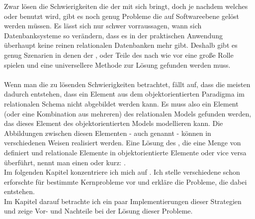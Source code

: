 Zwar lösen \OODBMSs die Schwierigkeiten die der \IM mit sich bringt, doch je nachdem welches \ORDBMS oder \RDBMS benutzt wird, gibt es noch genug Probleme die auf Softwareebene gelöst werden müssen. Es lässt sich nur schwer vorraussagen, wann sich Datenbanksysteme so verändern, dass es in der praktischen Anwendung überhaupt keine reinen relationalen Datenbanken mehr gibt. Deshalb gibt es genug Szenarien in denen der \IM, oder Teile des \IM nach wie vor eine große Rolle spielen und eine universellere Methode zur Lösung gefunden werden muss.\\
\\
Wenn man die zu lösenden Schwierigkeiten betrachtet, fällt auf, dass die meisten dadurch entstehen, dass ein Element aus dem objektorientierten Paradigma im relationalen Schema nicht abgebildet werden kann. Es muss also ein Element (oder eine Kombination aus mehreren) des relationalen Models gefunden werden, das dieses Element des objektorientierten Models modellieren kann. Die Abbildungen zwischen diesen Elementen - auch  genannt - können in verschiedenen Weisen realisiert werden. Eine Lösung des \IM, die eine Menge von  definiert und relationale Elemente in objektorientierte Elemente oder vice versa überführt, nennt man einen  %
oder kurz: \ORM. \\
Im folgenden Kapitel konzentriere ich mich auf . Ich stelle verschiedene schon erforschte  für bestimmte Kernprobleme vor und erkläre die Probleme, die dabei entstehen. \\
Im Kapitel darauf betrachte ich ein paar Implementierungen dieser Strategien und zeige Vor- und Nachteile bei der Lösung dieser Probleme.\\
